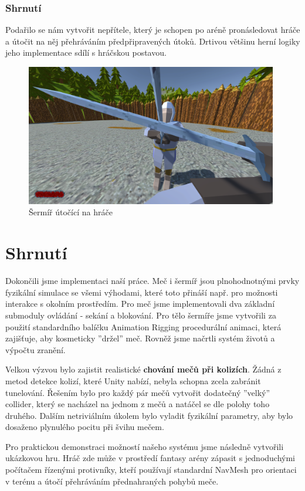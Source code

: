 \subsubsection*{Shrnutí}

Podařilo se nám vytvořit nepřítele, který je schopen po aréně pronásledovat hráče a útočit na něj přehráváním předpřipravených útoků. Drtivou většinu herní logiky jeho implementace sdílí s hráčskou postavou.

\begin{figure}[h!]\centering
  \center
  \includegraphics[width=110mm]{../img/demogameFight.png}
  \caption{Šermíř útočící na hráče}
  \label{obr05:demogameFight}
\end{figure} 

\section{Shrnutí}

Dokončili jsme implementaci naší práce. Meč i šermíř jsou plnohodnotnými prvky fyzikální simulace se všemi výhodami, které toto přináší např. pro možnosti interakce s okolním prostředím. Pro meč jsme implementovali dva základní submoduly ovládání - sekání a blokování. Pro tělo šermíře jsme vytvořili za použití standardního balíčku Animation Rigging procedurální animaci, která zajišťuje, aby kosmeticky ''držel'' meč. Rovněž jsme načrtli systém životů a výpočtu zranění.

Velkou výzvou bylo zajistit realistické \textbf{chování mečů při kolizích}. Žádná z metod detekce kolizí, které Unity nabízí, nebyla schopna zcela zabránit tunelování. Řešením bylo pro každý pár mečů vytvořit dodatečný ''velký'' collider, který se nacházel na jednom z mečů a natáčel se dle polohy toho druhého. Dalším netriviálním úkolem bylo vyladit fyzikální parametry, aby bylo dosaženo plynulého pocitu při švihu mečem. 

Pro praktickou demonstraci možností našeho systému jsme následně vytvořili ukázkovou hru. Hráč zde může v prostředí fantasy arény zápasit s jednoduchými počítačem řízenými protivníky, kteří používají standardní NavMesh pro orientaci v terénu a útočí přehráváním přednahraných pohybů meče. 
